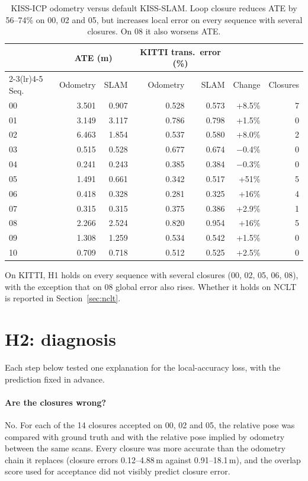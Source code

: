\documentclass[11pt,a4paper]{article}
\begin{document}
\begin{table}[h]
\centering
\small
\begin{tabular}{lrrrrrr}
\toprule
 & \multicolumn{2}{c}{ATE (m)} & \multicolumn{2}{c}{KITTI trans.\ error (\%)} & & \\
\cmidrule(lr){2-3}\cmidrule(lr){4-5}
Seq. & Odometry & SLAM & Odometry & SLAM & Change & Closures \\
\midrule
00 & 3.501 & 0.907 & 0.528 & 0.573 & +8.5\% & 7 \\
01 & 3.149 & 3.117 & 0.786 & 0.798 & +1.5\% & 0 \\
02 & 6.463 & 1.854 & 0.537 & 0.580 & +8.0\% & 2 \\
03 & 0.515 & 0.528 & 0.677 & 0.674 & $-$0.4\% & 0 \\
04 & 0.241 & 0.243 & 0.385 & 0.384 & $-$0.3\% & 0 \\
05 & 1.491 & 0.661 & 0.342 & 0.517 & +51\% & 5 \\
06 & 0.418 & 0.328 & 0.281 & 0.325 & +16\% & 4 \\
07 & 0.315 & 0.315 & 0.375 & 0.386 & +2.9\% & 1 \\
08 & 2.266 & 2.524 & 0.820 & 0.954 & +16\% & 5 \\
09 & 1.308 & 1.259 & 0.534 & 0.542 & +1.5\% & 0 \\
10 & 0.709 & 0.718 & 0.512 & 0.525 & +2.5\% & 0 \\
\bottomrule
\end{tabular}
\caption{KISS-ICP odometry versus default KISS-SLAM. Loop closure reduces ATE by 56--74\% on 00, 02 and 05,
but increases local error on every sequence with several closures. On 08 it also worsens ATE.}
\label{tab:base}
\end{table}

On KITTI, H1 holds on every sequence with several closures (00, 02, 05, 06, 08), with the exception that on 08
global error also rises. Whether it holds on NCLT is reported in Section~\ref{sec:nclt}.

\section{H2: diagnosis}
Each step below tested one explanation for the local-accuracy loss, with the prediction fixed in advance.

\paragraph{Are the closures wrong?} No. For each of the 14 closures accepted on 00, 02 and 05, the relative pose
was compared with ground truth and with the relative pose implied by odometry between the same scans. Every
closure was more accurate than the odometry chain it replaces (closure errors 0.12--4.88\,m against
0.91--18.1\,m), and the overlap score used for acceptance did not visibly predict closure error.
\end{document}

